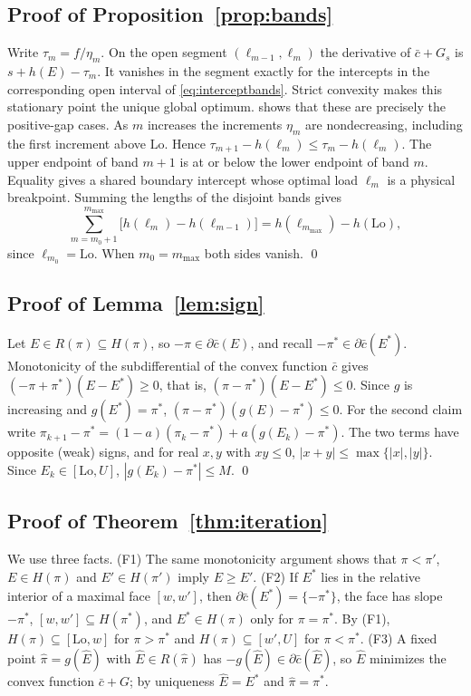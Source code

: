 \subsection{Proof of Proposition~\ref{prop:bands}}
Write $\tau_m=f/\eta_m$. On the open segment
$(\ell_{m-1},\ell_m)$ the derivative of $\bar c+G_s$ is
$s+h(E)-\tau_m$. It vanishes in the segment exactly for the intercepts in
the corresponding open interval of \eqref{eq:interceptbands}.
Strict convexity makes this stationary point the unique global optimum.
 shows that these are precisely the positive-gap cases.
As $m$ increases the increments $\eta_m$ are nondecreasing, including the
first increment above $\mathrm{Lo}$. Hence
$\tau_{m+1}-h(\ell_m)\le\tau_m-h(\ell_m)$. The upper endpoint of band $m+1$
is at or below the lower endpoint of band $m$. Equality gives a shared
boundary intercept whose optimal load $\ell_m$ is a physical breakpoint.
Summing the lengths of the disjoint bands gives
\[
 \sum_{m=m_0+1}^{m_{\max}}\bigl[h(\ell_m)-h(\ell_{m-1})\bigr]
 =h(\ell_{m_{\max}})-h(\mathrm{Lo}),
\]
since $\ell_{m_0}=\mathrm{Lo}$. When $m_0=m_{\max}$ both sides vanish. \qed

\subsection{Proof of Lemma~\ref{lem:sign}}
Let $E\in R(\pi)\subseteq H(\pi)$, so $-\pi\in\partial\bar c(E)$, and recall
$-\pi^*\in\partial\bar c(E^*)$. Monotonicity of the subdifferential of the convex
function $\bar c$ gives $(-\pi+\pi^*)(E-E^*)\ge0$, that is, $(\pi-\pi^*)(E-E^*)\le0$.
Since $g$ is increasing and $g(E^*)=\pi^*$, $(\pi-\pi^*)(g(E)-\pi^*)\le0$. For the
second claim write
$\pi_{k+1}-\pi^*=(1-a)(\pi_k-\pi^*)+a(g(E_k)-\pi^*)$. The two terms have
opposite (weak) signs, and for real $x,y$ with $xy\le0$, $|x+y|\le\max\{|x|,|y|\}$.
Since $E_k\in[\mathrm{Lo},U]$, $|g(E_k)-\pi^*|\le M$. \qed

\subsection{Proof of Theorem~\ref{thm:iteration}}
We use three facts. (F1) The same monotonicity argument shows that $\pi<\pi'$,
$E\in H(\pi)$ and $E'\in H(\pi')$ imply $E\ge E'$. (F2) If $E^*$ lies in the relative
interior of a maximal face $[w,w']$, then $\partial\bar c(E^*)=\{-\pi^*\}$, the face
has slope $-\pi^*$, $[w,w']\subseteq H(\pi^*)$, and $E^*\in H(\pi)$ only for
$\pi=\pi^*$. By (F1), $H(\pi)\subseteq[\mathrm{Lo},w]$ for $\pi>\pi^*$ and
$H(\pi)\subseteq[w',U]$ for $\pi<\pi^*$. (F3) A fixed point $\hat\pi=g(\hat E)$ with
$\hat E\in R(\hat\pi)$ has $-g(\hat E)\in\partial\bar c(\hat E)$, so $\hat E$
minimizes the convex function $\bar c+G$; by uniqueness $\hat E=E^*$ and
$\hat\pi=\pi^*$.


